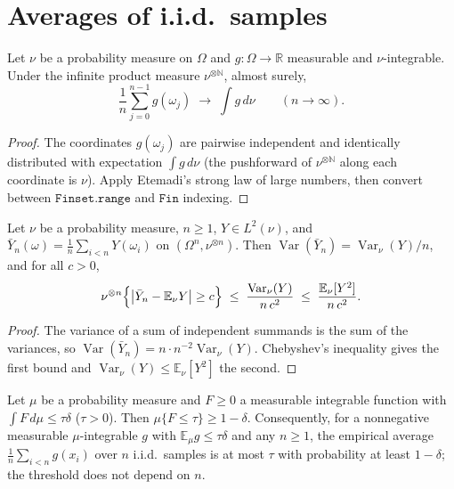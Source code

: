 \section{Averages of i.i.d.\ samples}\label{sec:ntkf:iid}

\begin{theorem}\label{thm:ntkf:slln}
  \leanok
Let $\nu$ be a probability measure on $\Omega$ and $g:\Omega\to\mathbb R$ measurable and
$\nu$-integrable. Under the infinite product measure $\nu^{\otimes\mathbb N}$, almost surely,
\[
  \frac1n\sum_{j=0}^{n-1}g(\omega_j)\;\longrightarrow\;\int g\,d\nu\qquad(n\to\infty).
\]
\end{theorem}

\begin{proof}
  \leanok
The coordinates $g(\omega_j)$ are pairwise independent and identically distributed with
expectation $\int g\,d\nu$ (the pushforward of $\nu^{\otimes\mathbb N}$ along each coordinate is
$\nu$). Apply Etemadi's strong law of large numbers, then convert between $\texttt{Finset.range}$
and $\texttt{Fin}$ indexing.
\end{proof}

\begin{lemma}\label{lem:ntkf:chebyshev}
  \leanok
Let $\nu$ be a probability measure, $n\ge1$, $Y\in L^2(\nu)$, and $\bar Y_n(\omega)=\frac1n\sum_{i<n}Y(\omega_i)$ on
$(\Omega^n,\nu^{\otimes n})$. Then $\operatorname{Var}(\bar Y_n)=\operatorname{Var}_\nu(Y)/n$, and for all $c>0$,
\[
  \nu^{\otimes n}\Bigl\{\bigl|\bar Y_n-\mathbb E_\nu Y\bigr|\ge c\Bigr\}
  \;\le\;\frac{\operatorname{Var}_\nu(Y)}{n\,c^2}\;\le\;\frac{\mathbb E_\nu[Y^2]}{n\,c^2}.
\]
\end{lemma}

\begin{proof}
  \leanok
The variance of a sum of independent summands is the sum of the variances, so
$\operatorname{Var}(\bar Y_n)=n\cdot n^{-2}\operatorname{Var}_\nu(Y)$. Chebyshev's inequality gives the first bound and
$\operatorname{Var}_\nu(Y)\le\mathbb E_\nu[Y^2]$ the second.
\end{proof}

\begin{lemma}\label{lem:ntkf:markov}
  \leanok
Let $\mu$ be a probability measure and $F\ge0$ a measurable integrable function with
$\int F\,d\mu\le\tau\delta$ ($\tau>0$). Then $\mu\{F\le\tau\}\ge1-\delta$. Consequently, for
a nonnegative measurable $\mu$-integrable $g$ with $\mathbb E_\mu g\le\tau\delta$ and any
$n\ge1$, the empirical average $\frac1n\sum_{i<n}g(x_i)$ over $n$ i.i.d.\ samples is at most
$\tau$ with probability at least $1-\delta$; the threshold does not depend on $n$.
\end{lemma}

